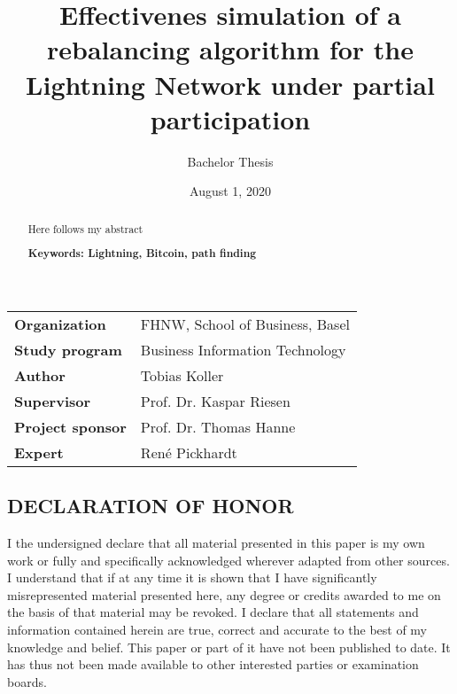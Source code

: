 \documentclass[final]{fhnwreport}       %
\title{Effectivenes simulation of a rebalancing algorithm for the Lightning Network under partial participation}                          %
\author{Bachelor Thesis}                %
\date{August 1, 2020}                   %
\begin{document}
\maketitle

\vspace*{-1cm}                            %
\vfill
{
\renewcommand\arraystretch{2}
\begin{center}
\begin{tabular}{>{\bf}p{4cm} l}
Organization                  &    FHNW, School of Business, Basel\\
Study program                 &    Business Information Technology\\
Author                        &    Tobias Koller\\
Supervisor                    &    Prof. Dr. Kaspar Riesen\\
Project sponsor               &    Prof. Dr. Thomas Hanne\\
Expert                        &    René Pickhardt
\end{tabular}
\end{center}
}
\clearpage

\thispagestyle{empty}
\begin{abstract}
  Here follows my abstract

  \vspace{2ex}
  \textbf{Keywords: Lightning, Bitcoin, path finding}
\end{abstract}
\vfill

\tableofcontents
\clearpage

\vfill\noindent
\begin{center}
 \section*{DECLARATION OF HONOR}
\end{center}

I the undersigned declare that all material presented in this paper is my own work or fully and specifically acknowledged wherever adapted from other sources. I understand that if at any time it is shown that I have significantly misrepresented material presented here, any degree or credits awarded to me on the basis of that material may be revoked. I declare that all statements and information contained herein are true, correct and accurate to the best of my knowledge and belief. This  paper or part of it have not been published to date. It has thus not been made available to other interested parties or examination boards.  
\end{document}
